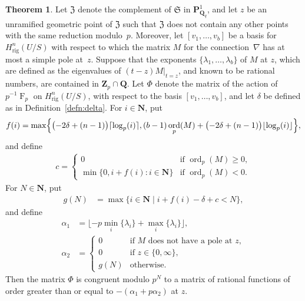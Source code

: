 \documentclass[a4paper,11pt]{article}
\numberwithin{equation}{section}
\newcommand{\NN}{\mathbf{N}} %
\newcommand{\ZZ}{\mathbf{Z}} %
\newcommand{\QQ}{\mathbf{Q}} %
\DeclareMathOperator{\ord}{ord}          %
\DeclareMathOperator{\Frob}{F}           %
\providecommand{\Hrig}{H_{\text{rig}}}  %
\theoremstyle{definition}
\newtheorem{thm}{Theorem}[section]
\begin{document}
\begin{thm} \label{thm:KedlayaTuitman}
Let $\mathfrak{Z}$ denote the complement of $\mathfrak{S}$ in 
$\mathbf{P}^{1}_{\mathbf{Q}_q}$, and let $z$ be an unramified geometric point 
of $\mathfrak{Z}$ such that $\mathfrak{Z}$ does not contain any other points 
with the same reduction modulo~$p$. Moreover, let $[v_1,\dotsc,v_b]$ be a basis for 
$\Hrig^n(U/S)$ with respect to which the matrix $M$ for the connection~$\nabla$ 
has at most a simple pole at~$z$. Suppose that the exponents 
$\{ \lambda_1, \dotsc, \lambda_{b} \}$ of $M$ at $z$, 
which are defined as the eigenvalues of $(t - z) M \vert_{t=z}$, and known to 
be rational numbers, are contained in $\ZZ_p \cap \QQ$. Let $\Phi$ denote the matrix of the action of 
$p^{-1} \Frob_p$ on $\Hrig^{n}(U/S)$, with respect to the basis 
$[v_1,\dotsc,v_b]$, and let $\delta$ be defined as in 
Definition~\ref{defn:delta}. For $i \in \NN$, put
\begin{align*}
f(i) = \max \Bigl\{ \bigl( -2 \delta + (n-1) \bigr) \lceil \log_p(i) \rceil, 
(b-1) \ord_p(M) + \bigl( -2 \delta + (n-1) \bigr) \lfloor \log_p(i) \rfloor 
\Bigr\},
\end{align*}
and define 
\begin{align*}
c = \begin{cases}
0 & \mbox{if $\ord_p(M) \geq 0$}, \\
\min\{0, i + f(i): i \in \NN\} & \mbox{if $\ord_p(M) < 0$}.
\end{cases}
\end{align*}
For $N \in \NN$, put
\begin{align*}
g(N) &= \max \{i \in \NN \; | \; i + f(i) - \delta + c  < N \},
\end{align*}
and define
\begin{align*}
\alpha_1 &= \lfloor -p \min_i \{ \lambda_i \} + \max_{i} \{\lambda_i\} \rfloor, \\ 
\alpha_2 &=  \left \{ 
         \begin{array}{cl}
         0  & \mbox{if $M$ does not have a pole at $z$},  \\
         0  & \mbox{if $z \in \{0,\infty \}$}, \\
         g(N) & \mbox{otherwise}.
         \end{array}
         \right. 
\end{align*}
Then the matrix $\Phi$ is congruent modulo $p^{N}$ to a matrix of rational functions of order greater 
than or equal to $-(\alpha_1+p \alpha_2)$ at $z$. 
\end{thm}
\end{document}

